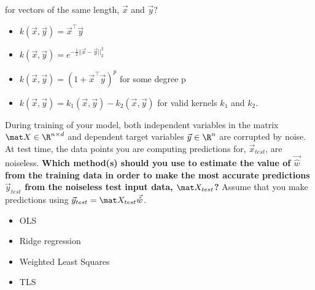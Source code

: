 \documentclass[preview]{standalone}
\begin{document}
\begin{Parts}
	

	 for vectors of the same length, $\vec{x}$ and $\vec{y}$?
	\begin{multicols}{2}
		\begin{itemize}
			\item[\mcqb] $k(\vec{x}, \vec{y}) = \vec{x}^\top \vec{y}$
			\item[\mcqb] $k(\vec{x}, \vec{y}) = e^{-\frac{1}{2} \lvert\lvert \vec{x} - \vec{y} \rvert\rvert^2_2}$
			\item[\mcqb] $k(\vec{x}, \vec{y}) = (1+\vec{x}^\top \vec y)^p$ for some degree p
			\item[\mcqb] $k(\vec{x}, \vec{y}) = k_1(\vec x,\vec y) - k_2(\vec x,\vec y)$ for valid kernels $k_1$ and $k_2$.
		\end{itemize}
	\end{multicols}

	

\ifexamnosol
\vspace{1in}
\fi






	                                                                        	        
								
	
	\Part During training of your model, both independent
	variables in the matrix $\mat X\in \R^{n\times d}$ and
	dependent target variables $\vec y\in \R^n$ are corrupted by
	noise. At test time, the data points you are
	computing predictions for, $\vec x_{test}$, are noiseless. {\bf Which method(s) should you use to estimate the value of $\vec{\hat{w}}$ from the training data in order to make the most accurate predictions $\vec y_{test}$ from the noiseless test input data, $\mat X_{test}$?} Assume that you make predictions using $\vec y_{test}=\mat X_{test} \vec{\hat{w}}$.

	\begin{multicols}{2}
		\begin{itemize}
			\item[\mcqb] OLS
			\item[\mcqb] Ridge regression
			\item[\mcqb] Weighted Least Squares
			\item[\mcqb] TLS
		\end{itemize}
	\end{multicols}

	

\ifexamnosol
\vspace{1in}
\fi


\end{Parts}
\end{document}

